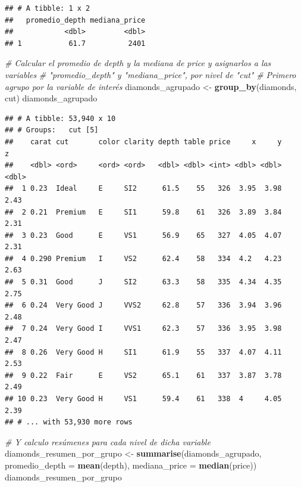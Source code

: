 \documentclass[]{book}
\newenvironment{Shaded}{\begin{snugshade}}{\end{snugshade}}
\newcommand{\KeywordTok}[1]{\textcolor[rgb]{0.13,0.29,0.53}{\textbf{#1}}}
\newcommand{\DataTypeTok}[1]{\textcolor[rgb]{0.13,0.29,0.53}{#1}}
\newcommand{\StringTok}[1]{\textcolor[rgb]{0.31,0.60,0.02}{#1}}
\newcommand{\CommentTok}[1]{\textcolor[rgb]{0.56,0.35,0.01}{\textit{#1}}}
\newcommand{\NormalTok}[1]{#1}
\theoremstyle{definition}
\theoremstyle{definition}
\theoremstyle{definition}
\theoremstyle{remark}
\begin{document}
\begin{verbatim}
## # A tibble: 1 x 2
##   promedio_depth mediana_price
##            <dbl>         <dbl>
## 1           61.7          2401
\end{verbatim}

\begin{Shaded}
\begin{Highlighting}[]
\CommentTok{# Calcular el promedio de depth y la mediana de price y asignarlos a las variables}
\CommentTok{# "promedio_depth" y "mediana_price", por nivel de "cut"}
\CommentTok{# Primero agrupo por la variable de interés}
\NormalTok{diamonds_agrupado <-}\StringTok{ }\KeywordTok{group_by}\NormalTok{(diamonds, cut)}
\NormalTok{diamonds_agrupado}
\end{Highlighting}
\end{Shaded}

\begin{verbatim}
## # A tibble: 53,940 x 10
## # Groups:   cut [5]
##    carat cut       color clarity depth table price     x     y     z
##    <dbl> <ord>     <ord> <ord>   <dbl> <dbl> <int> <dbl> <dbl> <dbl>
##  1 0.23  Ideal     E     SI2      61.5    55   326  3.95  3.98  2.43
##  2 0.21  Premium   E     SI1      59.8    61   326  3.89  3.84  2.31
##  3 0.23  Good      E     VS1      56.9    65   327  4.05  4.07  2.31
##  4 0.290 Premium   I     VS2      62.4    58   334  4.2   4.23  2.63
##  5 0.31  Good      J     SI2      63.3    58   335  4.34  4.35  2.75
##  6 0.24  Very Good J     VVS2     62.8    57   336  3.94  3.96  2.48
##  7 0.24  Very Good I     VVS1     62.3    57   336  3.95  3.98  2.47
##  8 0.26  Very Good H     SI1      61.9    55   337  4.07  4.11  2.53
##  9 0.22  Fair      E     VS2      65.1    61   337  3.87  3.78  2.49
## 10 0.23  Very Good H     VS1      59.4    61   338  4     4.05  2.39
## # ... with 53,930 more rows
\end{verbatim}

\begin{Shaded}
\begin{Highlighting}[]
\CommentTok{# Y calculo resúmenes para cada nivel de dicha variable}
\NormalTok{diamonds_resumen_por_grupo <-}\StringTok{ }\KeywordTok{summarise}\NormalTok{(diamonds_agrupado, }\DataTypeTok{promedio_depth =} \KeywordTok{mean}\NormalTok{(depth), }\DataTypeTok{mediana_price =} \KeywordTok{median}\NormalTok{(price))}
\NormalTok{diamonds_resumen_por_grupo}
\end{Highlighting}
\end{Shaded}
\end{document}
